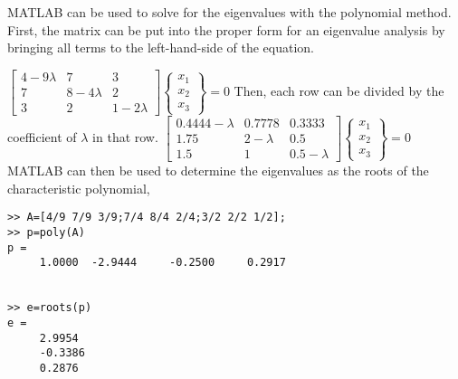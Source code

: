 \documentclass[../main.tex]{subfiles}
\begin{document}
\section{}
\begin{blockquote}
MATLAB can be used to solve for the eigenvalues with the polynomial method. First, the matrix can be put into the proper form for an eigenvalue analysis by bringing all terms to the left-hand-side of the equation.
\end{blockquote}
	\bigbreak
$\left[\begin{array}{ccc}4-9 \lambda & 7 & 3 \\
 7 & 8-4 \lambda & 2 \\
 3 & 2 & 1-2 \lambda\end{array}\right]\left\{\begin{array}{l}x_{1} \\ x_{2} \\ 
x_{3}\end{array}\right\}=0$
	\bigbreak
Then, each row can be divided by the coefficient of $\lambda$ in that row.
	\bigbreak
$\left[\begin{array}{ccc}0.4444-\lambda & 0.7778 & 0.3333 \\
 1.75 & 2-\lambda & 0.5 \\
 1.5 & 1 & 0.5-\lambda\end{array}\right]\left\{\begin{array}{l}x_{1} \\ x_{2} \\
 x_{3}\end{array}\right\}=0$
	\bigbreak
MATLAB can then be used to determine the eigenvalues as the roots of the characteristic polynomial,
	\bigbreak
\begin{lstlisting}[numbers=none]
>> A=[4/9 7/9 3/9;7/4 8/4 2/4;3/2 2/2 1/2];
>> p=poly(A)
p =
	 1.0000	 -2.9444	 -0.2500	 0.2917


>> e=roots(p)
e =
	 2.9954
	 -0.3386
	 0.2876 
\end{lstlisting}
	\bigbreak
\end{document}
